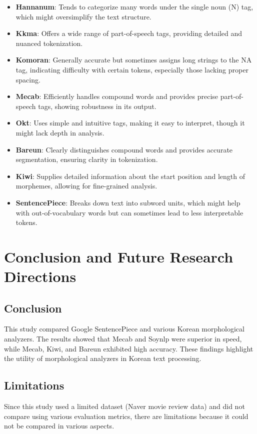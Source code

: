 \documentclass{article}
\begin{document}
\begin{itemize}
    \item \textbf{Hannanum}: Tends to categorize many words under the single noun (N) tag, which might oversimplify the text structure.
    \item \textbf{Kkma}: Offers a wide range of part-of-speech tags, providing detailed and nuanced tokenization.
    \item \textbf{Komoran}: Generally accurate but sometimes assigns long strings to the NA tag, indicating difficulty with certain tokens, especially those lacking proper spacing.
    \item \textbf{Mecab}: Efficiently handles compound words and provides precise part-of-speech tags, showing robustness in its output.
    \item \textbf{Okt}: Uses simple and intuitive tags, making it easy to interpret, though it might lack depth in analysis.
    \item \textbf{Bareun}: Clearly distinguishes compound words and provides accurate segmentation, ensuring clarity in tokenization.
    \item \textbf{Kiwi}: Supplies detailed information about the start position and length of morphemes, allowing for fine-grained analysis.
    \item \textbf{SentencePiece}: Breaks down text into subword units, which might help with out-of-vocabulary words but can sometimes lead to less interpretable tokens.
\end{itemize}


\section{Conclusion and Future Research Directions}

\subsection{Conclusion}

This study compared Google SentencePiece and various Korean morphological analyzers. The results showed that Mecab and Soynlp were superior in speed, while Mecab, Kiwi, and Bareun exhibited high accuracy. These findings highlight the utility of morphological analyzers in Korean text processing.

\subsection{Limitations}
Since this study used a limited dataset (Naver movie review data) and did not compare using various evaluation metrics, there are limitations because it could not be compared in various aspects.
\end{document}
